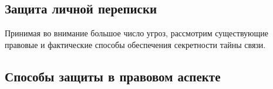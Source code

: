 \parindent=1cm %
\begin{center}
		
		\section{Защита личной переписки}
		
\end{center}


Принимая во внимание большое число угроз, рассмотрим существующие правовые и фактические способы обеспечения секретности тайны связи.
\subsection{Способы защиты в правовом аспекте}
\newpage 